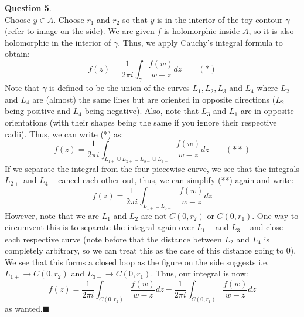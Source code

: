 \documentclass{article}
\begin{document}
    \textbf{Question 5}.\\
    Choose $y\in A$. Choose $r_1$ and $r_2$ so that $y$ is in the interior of the toy contour $\gamma$ (refer to image on the 
    side). We are given $f$ is holomorphic inside $A$, so it is also holomorphic in the interior of $\gamma$. Thus, we apply
    Cauchy's integral formula to obtain:
    \[ f(z) = \frac{1}{2\pi i}\int_{\gamma} \frac{f(w)}{w-z}dz \qquad (*)\]
    Note that $\gamma$ is defined to be the union of the curves $L_1, L_2, L_3$ and $L_4$ where $L_2$ and $L_4$ are (almost) the same
    lines but are oriented in opposite directions ($L_2$ being positive and $L_4$ being negative). Also, note that $L_3$ and $L_1$ are
    in opposite orientations (with their shapes being the same if you ignore their respective radii). Thus, we can write (*) as:
    \[ f(z) = \frac{1}{2\pi i}\int_{L_{1+} \cup L_{2+} \cup L_{3-} \cup L_{4-}}\frac{f(w)}{w-z}dz \qquad (**) \] 
    If we separate the integral from the four piecewise curve, we see that the integrals $L_{2+}$ and $L_{4-}$ cancel each other
    out, thus, we can simplify (**) again and write:
    \[ f(z) = \frac{1}{2\pi i}\int_{L_{1+} \cup L_{3-}} \frac{f(w)}{w-z}dz \]
    However, note that we are $L_1$ and $L_2$ are not $C(0,r_2)$ or $C(0,r_1)$. One way to circumvent this is to separate the 
    integral again
    over $L_{1+}$ and $L_{3-}$ and close each respective curve (note before that the distance between $L_2$ and $L_4$ is 
    completely arbitrary, so we can treat this as the case of this distance going to 0).
    We see that this forms a closed loop as the figure on the side suggests
    i.e. $L_{1+} \to C(0,r_2)$ and $L_{3-} \to C(0,r_1)$. Thus, our integral is now:
    \[ f(z) = \frac{1}{2\pi i}\int_{C(0,r_2)} \frac{f(w)}{w-z}dz - \frac{1}{2\pi i}\int_{C(0,r_1)} \frac{f(w)}{w-z}dz \]
    as wanted.\hfill$\blacksquare$
\end{document}
